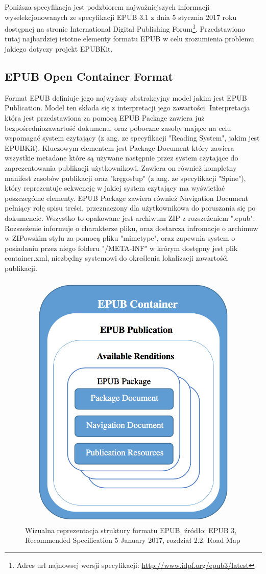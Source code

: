 Poniższa specyfikacja jest podzbiorem najważniejszych informacji wyselekcjonowanych ze specyfikacji EPUB 3.1 z dnia 5 stycznia 2017 roku
dostępnej na stronie International Digital Publishing Forum\footnote{Adres url najnowsej wersji specyfikacji: \href{http://www.idpf.org/epub3/latest}{http://www.idpf.org/epub3/latest}}.
Przedstawiono tutaj najbardziej istotne elementy formatu EPUB w celu zrozumienia problemu jakiego dotyczy projekt EPUBKit.

\subsection*{EPUB Open Container Format}

Format EPUB definiuje jego najwyższy abstrakcyjny model jakim jest EPUB Publication. Model ten składa się z interpretacji jego zawartości.
Interpretacja która jest przedstawiona za pomocą EPUB Package zawiera już bezpośredniozawartość dokumenu, oraz poboczne zasoby mające
na celu wspomagać system czytający (z ang. ze specyfikacji "Reading System", jakim jest EPUBKit). Kluczowym elementem jest Package
Document który zawiera wszystkie metadane które są używane następnie przez system czytające do zaprezentowania publikacji użytkownikowi.
Zawiera on również kompletny manifest zasobów publikacji oraz "kręgosłup" (z ang. ze specyfikacji "Spine"), który reprezentuje sekwencję
w jakiej system czytający ma wyświetlać poszczególne elementy. EPUB Package zawiera również Navigation Document pełniący rolę spisu
treści, przeznaczony dla użytkownikowa do poruszania się po dokumencie. Wszystko to opakowane jest archiwum ZIP z rozszeżeniem ".epub".
Rozszeżenie informuje o charakterze pliku, oraz dostarcza infromacje o archimuw w ZIPowskim stylu za pomocą pliku "mimetype", oraz
zapewnia system o posiadaniu przez niego folderu "/META-INF" w krórym dostępny jest plik container.xml, niezbędny systemowi do określenia
lokalizacji zawartośći publikacji.

\begin{figure}[ht!]
  \centering
  \includegraphics[width=.4\linewidth]{images/chapter-3-image-1-structure.png}
  \caption{Wizualna reprezentacja struktury formatu EPUB. źródło: EPUB 3, Recommended Specification 5 January 2017, rozdział 2.2. Road Map}
  \label{chapter-3-image-1-structure}
\end{figure}

